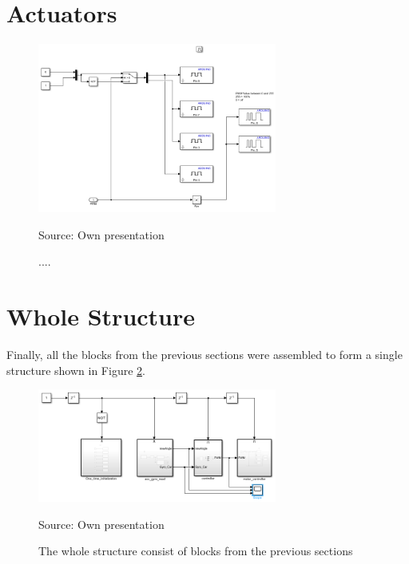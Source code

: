 \section{Actuators}

	\begin{figure}[!htbp]
		\centering
		\includegraphics[width=0.7\textwidth]{figures/act.PNG}
		\caption{....}	
		Source: Own presentation	
		\label{fig:act}	
	\end{figure}


\section{Whole Structure}
Finally, all the blocks from the previous sections were assembled to form a single structure shown in Figure \ref{fig:struct}.

	\begin{figure}[!htbp]
		\centering
		\includegraphics[width=0.7\textwidth]{figures/struct.PNG}
		\caption{The whole structure consist of blocks from the previous sections}	
		Source: Own presentation	
		\label{fig:struct}	
	\end{figure}




